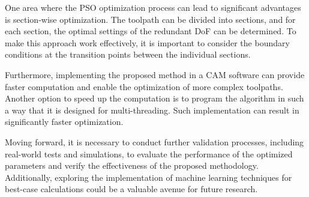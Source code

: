 One area where the PSO optimization process can lead to significant advantages is section-wise optimization. The toolpath can be divided into sections, and for each section, the optimal settings of the redundant DoF can be determined. To make this approach work effectively, it is important to consider the boundary conditions at the transition points between the individual sections.

Furthermore, implementing the proposed method in a CAM software can provide faster computation and enable the optimization of more complex toolpaths. Another option to speed up the computation is to program the algorithm in such a way that it is designed for multi-threading. Such implementation can result in significantly faster optimization.  

Moving forward, it is necessary to conduct further validation processes, including real-world tests and simulations, to evaluate the performance of the optimized parameters and verify the effectiveness of the proposed methodology. Additionally, exploring the implementation of machine learning techniques for best-case calculations could be a valuable avenue for future research.


